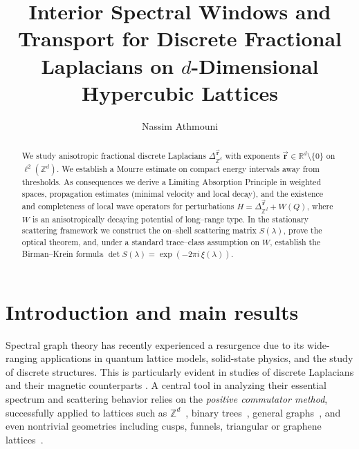 \documentclass[10pt]{amsart} %
\newcommand{\Z}{{\mathbb{Z}}}
\newcommand{\1}{{\mathbb{I}}}
\numberwithin{equation}{section}
\begin{document}
\title[Interior Spectral Windows and Transport on $\mathbb{Z}^d$]%
{Interior Spectral Windows and Transport for Discrete Fractional Laplacians on $d$-Dimensional Hypercubic Lattices}
\author{Nassim Athmouni}
\address{Universit- de Gafsa, Campus Universitaire 2112, Tunisie}









\begin{abstract}
We study anisotropic fractional discrete Laplacians $\Delta_{\mathbb{Z}^d}^{\vec{\mathbf{r}}}$ with exponents $\vec{\mathbf{r}}\in\mathbb{R}^d\setminus\{0\}$ on $\ell^2(\mathbb{Z}^d)$.
We establish a Mourre estimate on compact energy intervals away from thresholds.
As consequences we derive a Limiting Absorption Principle in weighted spaces, propagation estimates (minimal velocity and local decay), and the existence and completeness of local wave operators for perturbations $H=\Delta_{\mathbb{Z}^d}^{\vec{\mathbf{r}}}+W(Q)$, where $W$ is an anisotropically decaying potential of long--range type.
In the stationary scattering framework we construct the on--shell scattering matrix $S(\lambda)$, prove the optical theorem, and, under a standard trace--class assumption on $W$, establish the Birman--Krein formula $\det S(\lambda)=\exp(-2\pi i\,\xi(\lambda))$.
\end{abstract}





\maketitle
\tableofcontents
\section{Introduction and main results}

Spectral graph theory has recently experienced a resurgence due to its wide-ranging applications in
quantum lattice models, solid-state physics, and the study of discrete structures. This is particularly evident in studies of discrete Laplacians \cite{AD,AEG,BG,S,GG,Ch,Mic,Gk} and their magnetic counterparts \cite{GT,Da1,GoMo,AEG1,ABDE}.
A central tool in analyzing their essential spectrum and scattering behavior
relies on the \emph{positive commutator method}, successfully applied to
lattices such as $\Z^d$~\cite{PR,BoSa,T1},
binary trees~\cite{S,AF,GG}, general graphs~\cite{MRT},
and even nontrivial geometries including cusps, funnels, triangular or graphene lattices~\cite{T2,GoMo,AEG,AEG1,AEGJ,AEGJ2}.
\end{document}
